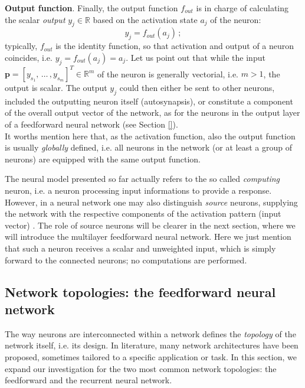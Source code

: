 \documentclass[11pt, a4paper]{report}
\numberwithin{equation}{chapter}
\theoremstyle{theorem}
\theoremstyle{definition}
\numberwithin{figure}{section}
\begin{document}
		\noindent \textbf{Output function}. Finally, the output function $f_{out}$ is in charge of calculating the scalar \emph{output} $y_j \in \mathbb{R}$ based on the activation state $a_j$ of the neuron:
		\begin{equation}
			\label{eq:output-function}
			y_j = f_{out}(a_j) \, ;
		\end{equation} 
		typically, $f_{out}$ is the identity function, so that activation and output of a neuron coincides, i.e. $y_j = f_{out}(a_j) = a_j$. Let us point out that while the input $\boldsymbol{p} = [y_{s_1}, \, \ldots \, , y_{s_m}]^T \in \mathbb{R}^m$ of the neuron is generally vectorial, i.e. $m > 1$, the output is scalar. The output $y_j$ could then either be sent to other neurons, included the outputting neuron itself (autosynapsis), or constitute a component of the overall output vector of the network, as for the neurons in the output layer of a feedforward neural network (see Section \ref{}). \\
		It worths mention here that, as the activation function, also the output function is usually \emph{globally} defined, i.e. all neurons in the network (or at least a group of neurons) are equipped with the same output function.
		
		\vspace*{0.3cm}
		
		The neural model presented so far actually refers to the so called \emph{computing} neuron, i.e. a neuron processing input informations to provide a response. However, in a neural network one may also distinguish \emph{source} neurons, supplying the network with the respective components of the activation pattern (input vector) \cite{Hay05}. The role of source neurons will be clearer in the next section, where we will introduce the multilayer feedforward neural network. Here we just mention that such a neuron receives a scalar and unweighted input, which is simply forward to the connected neurons; no computations are performed.
		
	\subsection{Network topologies: the feedforward neural network}
	\label{section:Network topologies}
		
		The way neurons are interconnected within a network defines the \emph{topology} of the network itself, i.e. its design. In literature, many network architectures have been proposed, sometimes tailored to a specific application or task. In this section, we expand our investigation for the two most common network topologies: the feedforward and the recurrent neural network.
		
\end{document}
